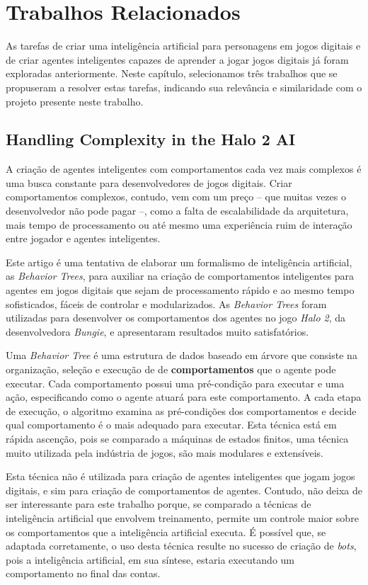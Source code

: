 \chapter{\label{chap:related-work}Trabalhos Relacionados}
As tarefas de criar uma inteligência artificial para personagens em jogos
digitais e de criar agentes inteligentes capazes de aprender a jogar jogos
digitais já foram exploradas anteriormente. Neste capítulo, selecionamos três
trabalhos que se propuseram a resolver estas tarefas, indicando sua relevância e
similaridade com o projeto presente neste trabalho. 


\section{Handling Complexity in the Halo 2 AI}
A criação de agentes inteligentes com comportamentos cada vez mais complexos é
uma busca constante para desenvolvedores de jogos digitais. Criar comportamentos
complexos, contudo, vem com um preço -- que muitas vezes o desenvolvedor não
pode pagar --, como a falta de escalabilidade da arquitetura, mais tempo de
processamento ou até mesmo uma experiência ruim de interação entre jogador e
agentes inteligentes.

Este artigo é uma tentativa de elaborar um formalismo de inteligência
artificial, as \textit{Behavior Trees}, para auxiliar na criação de
comportamentos inteligentes para agentes em jogos digitais que sejam de
processamento rápido e ao mesmo tempo sofisticados, fáceis de controlar e
modularizados. As \textit{Behavior Trees} foram utilizadas para desenvolver os
comportamentos dos agentes no jogo \textit{Halo 2}, da desenvolvedora
\textit{Bungie}, e apresentaram resultados muito satisfatórios\cite{Halo2AI}.

Uma \textit{Behavior Tree} é uma estrutura de dados baseado em árvore que
consiste na organização, seleção e execução de de \textbf{comportamentos} que o
agente pode executar. Cada comportamento possui uma pré-condição para executar e
uma ação, especificando como o agente atuará para este comportamento. A cada
etapa de execução, o algoritmo examina as pré-condições dos comportamentos e
decide qual comportamento é o mais adequado para executar. Esta técnica está em
rápida ascenção, pois se comparado a máquinas de estados finitos, uma técnica
muito utilizada pela indústria de jogos, são mais modulares e
extensíveis\cite{Rabin:2015:GAP:2821138}.

Esta técnica não é utilizada para criação de agentes inteligentes que jogam
jogos digitais, e sim para criação de comportamentos de agentes. Contudo, não
deixa de ser interessante para este trabalho porque, se comparado a técnicas de
inteligência artificial que envolvem treinamento, permite um controle maior
sobre os comportamentos que a inteligência artificial executa. É possível que,
se adaptada corretamente, o uso desta técnica resulte no sucesso de criação de
\textit{bots}, pois a inteligência artificial, em sua síntese, estaria
executando um comportamento no final das contas.


